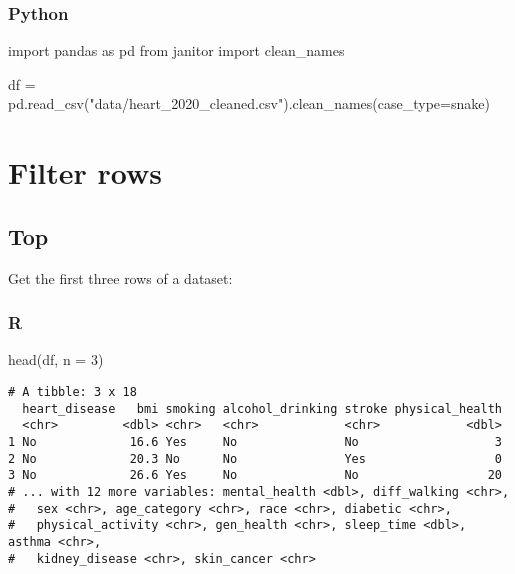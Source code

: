 \documentclass[
  letterpaper,
  DIV=11,
  numbers=noendperiod]{scrreprt}
\newenvironment{Shaded}{\begin{snugshade}}{\end{snugshade}}
\newcommand{\AttributeTok}[1]{\textcolor[rgb]{0.40,0.46,0.14}{#1}}
\newcommand{\DecValTok}[1]{\textcolor[rgb]{0.68,0.00,0.00}{#1}}
\newcommand{\FunctionTok}[1]{\textcolor[rgb]{0.28,0.35,0.67}{#1}}
\newcommand{\ImportTok}[1]{\textcolor[rgb]{0.00,0.46,0.62}{#1}}
\newcommand{\NormalTok}[1]{\textcolor[rgb]{0.00,0.46,0.62}{#1}}
\newcommand{\OperatorTok}[1]{\textcolor[rgb]{0.37,0.37,0.37}{#1}}
\newcommand{\StringTok}[1]{\textcolor[rgb]{0.13,0.47,0.30}{#1}}
\begin{document}
\hypertarget{python-12}{%
\subsubsection{Python}\label{python-12}}

\begin{Shaded}
\begin{Highlighting}[]
\ImportTok{import}\NormalTok{ pandas }\ImportTok{as}\NormalTok{ pd}
\ImportTok{from}\NormalTok{ janitor }\ImportTok{import}\NormalTok{ clean\_names}

\NormalTok{df }\OperatorTok{=}\NormalTok{ pd.read\_csv(}\StringTok{"data/heart\_2020\_cleaned.csv"}\NormalTok{).clean\_names(case\_type}\OperatorTok{=}\StringTok{\textquotesingle{}snake\textquotesingle{}}\NormalTok{)}
\end{Highlighting}
\end{Shaded}

\hypertarget{filter-rows}{%
\section{Filter rows}\label{filter-rows}}

\hypertarget{top}{%
\subsection{Top}\label{top}}

Get the first three rows of a dataset:

\hypertarget{r-13}{%
\subsubsection{R}\label{r-13}}

\begin{Shaded}
\begin{Highlighting}[]
\FunctionTok{head}\NormalTok{(df, }\AttributeTok{n =} \DecValTok{3}\NormalTok{)}
\end{Highlighting}
\end{Shaded}

\begin{verbatim}
# A tibble: 3 x 18
  heart_disease   bmi smoking alcohol_drinking stroke physical_health
  <chr>         <dbl> <chr>   <chr>            <chr>            <dbl>
1 No             16.6 Yes     No               No                   3
2 No             20.3 No      No               Yes                  0
3 No             26.6 Yes     No               No                  20
# ... with 12 more variables: mental_health <dbl>, diff_walking <chr>,
#   sex <chr>, age_category <chr>, race <chr>, diabetic <chr>,
#   physical_activity <chr>, gen_health <chr>, sleep_time <dbl>, asthma <chr>,
#   kidney_disease <chr>, skin_cancer <chr>
\end{verbatim}
\end{document}
